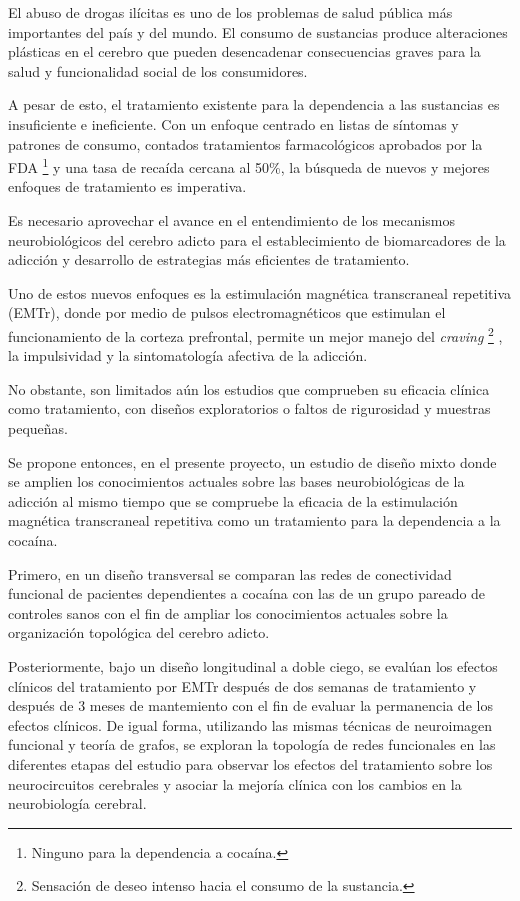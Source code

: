El abuso de drogas ilícitas es uno de los problemas de salud pública más
importantes del país y del mundo.
El consumo de sustancias produce alteraciones plásticas en el
cerebro que pueden desencadenar consecuencias graves para la salud y funcionalidad
social de los consumidores. \par
A pesar de esto, el tratamiento existente para la dependencia a las sustancias es insuficiente e ineficiente.
Con un enfoque centrado en listas de síntomas y patrones de consumo, contados tratamientos farmacológicos aprobados por la FDA
\footnote{Ninguno para la dependencia a cocaína.}
y una tasa de recaída cercana al 50\%, la búsqueda de nuevos y mejores enfoques de tratamiento es imperativa.\par
Es necesario aprovechar el avance en el entendimiento de los mecanismos neurobiológicos del cerebro adicto para el establecimiento de biomarcadores de la adicción y desarrollo de estrategias más eficientes de tratamiento.\par
Uno de estos nuevos enfoques es la estimulación magnética transcraneal repetitiva (EMTr), donde por medio de pulsos electromagnéticos que estimulan el funcionamiento de la corteza prefrontal, permite un mejor manejo del \textit{craving}
\footnote{Sensación de deseo intenso hacia el consumo de la sustancia.}
, la impulsividad y la sintomatología afectiva de la adicción. \par
No obstante, son limitados aún los estudios que comprueben su eficacia clínica como tratamiento, con diseños exploratorios o faltos de rigurosidad y muestras pequeñas. \par
Se propone entonces, en el presente proyecto, un estudio de diseño mixto donde se amplien los conocimientos actuales sobre las bases neurobiológicas de la adicción al mismo tiempo que se compruebe la eficacia de la estimulación magnética transcraneal repetitiva como un tratamiento para la dependencia a la cocaína.\par
Primero, en un diseño transversal se comparan las redes de conectividad funcional de pacientes dependientes a cocaína con las de un grupo pareado de controles sanos con el fin de ampliar los conocimientos actuales sobre la organización topológica del cerebro adicto.\par
Posteriormente, bajo un diseño longitudinal a doble ciego, se evalúan los efectos clínicos del tratamiento por EMTr después de dos semanas de tratamiento y después de 3 meses de mantemiento con el fin de evaluar la permanencia de los efectos clínicos. De igual forma, utilizando las mismas técnicas de neuroimagen funcional y teoría de grafos, se exploran la topología de redes funcionales en las diferentes etapas del estudio para observar los efectos del tratamiento sobre los neurocircuitos cerebrales y asociar la mejoría clínica con los cambios en la neurobiología cerebral.
